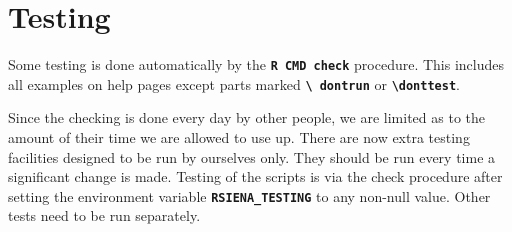 \documentclass[12pt, a4paper]{article}
\renewcommand{\=}{\,=\,}
\newcommand{\+}{\,+\,}
\newcommand{\sfn}[1]{\textbf{\texttt{#1}}}
\begin{document}
\section{Testing}
Some testing is done automatically  by the \sfn{R CMD check} procedure. This
includes all examples on help pages except parts marked \sfn{\textbackslash
  dontrun} or \sfn{\textbackslash donttest}.

Since the checking is done every day by other people, we are limited as to the
amount of their time we are allowed to use up. There are now extra testing
facilities designed to be run by ourselves only. They should be run every time a
significant change is made.  Testing of the scripts is via the check procedure
after setting the environment variable \sfn{RSIENA\_TESTING} to any non-null
value. Other tests need to be run separately.
\label{sec:tests}
\end{document}
